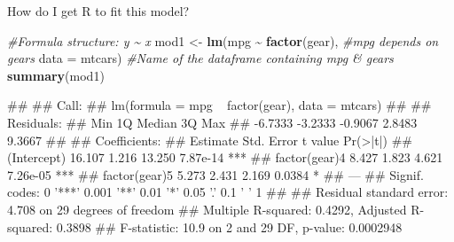 \documentclass[
  ignorenonframetext,
  aspectratio=169]{beamer}
\newenvironment{Shaded}{\begin{snugshade}}{\end{snugshade}}
\newcommand{\AttributeTok}[1]{\textcolor[rgb]{0.13,0.29,0.53}{#1}}
\newcommand{\CommentTok}[1]{\textcolor[rgb]{0.56,0.35,0.01}{\textit{#1}}}
\newcommand{\FunctionTok}[1]{\textcolor[rgb]{0.13,0.29,0.53}{\textbf{#1}}}
\newcommand{\NormalTok}[1]{#1}
\newcommand{\OtherTok}[1]{\textcolor[rgb]{0.56,0.35,0.01}{#1}}
\newcommand{\SpecialCharTok}[1]{\textcolor[rgb]{0.81,0.36,0.00}{\textbf{#1}}}
\let\oldShaded\Shaded %
\let\endoldShaded\endShaded
\renewenvironment{Shaded}{\scriptsize\oldShaded}{\endoldShaded}
\let\oldverbatim\verbatim %
\let\endoldverbatim\endverbatim
\renewenvironment{verbatim}{\tiny\oldverbatim}{\endoldverbatim}
\begin{document}
\begin{frame}[fragile]{How do I get R to fit this model?}
\protect\hypertarget{how-do-i-get-r-to-fit-this-model-2}{}
\tiny

\begin{Shaded}
\begin{Highlighting}[]
\CommentTok{\#Formula structure: y \textasciitilde{} x}
\NormalTok{mod1 }\OtherTok{\textless{}{-}} \FunctionTok{lm}\NormalTok{(mpg }\SpecialCharTok{\textasciitilde{}} \FunctionTok{factor}\NormalTok{(gear), }\CommentTok{\#mpg depends on gears}
           \AttributeTok{data =}\NormalTok{ mtcars) }\CommentTok{\#Name of the dataframe containing mpg \& gears}
\FunctionTok{summary}\NormalTok{(mod1)}
\end{Highlighting}
\end{Shaded}

\begin{verbatim}
## 
## Call:
## lm(formula = mpg ~ factor(gear), data = mtcars)
## 
## Residuals:
##     Min      1Q  Median      3Q     Max 
## -6.7333 -3.2333 -0.9067  2.8483  9.3667 
## 
## Coefficients:
##               Estimate Std. Error t value Pr(>|t|)    
## (Intercept)     16.107      1.216  13.250 7.87e-14 ***
## factor(gear)4    8.427      1.823   4.621 7.26e-05 ***
## factor(gear)5    5.273      2.431   2.169   0.0384 *  
## ---
## Signif. codes:  0 '***' 0.001 '**' 0.01 '*' 0.05 '.' 0.1 ' ' 1
## 
## Residual standard error: 4.708 on 29 degrees of freedom
## Multiple R-squared:  0.4292, Adjusted R-squared:  0.3898 
## F-statistic:  10.9 on 2 and 29 DF,  p-value: 0.0002948
\end{verbatim}
\end{frame}
\end{document}
